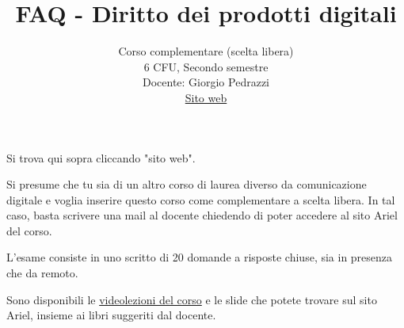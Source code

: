 \documentclass{article}
\title{FAQ - \textbf{Diritto dei prodotti digitali}}
\author{
	Corso complementare (scelta libera)\\6 CFU, Secondo semestre\\
	Docente: Giorgio Pedrazzi\\ 
	\href{https://gpedrazzidpd.ariel.ctu.unimi.it/v5/home/default.aspx/}{Sito web}
	\date{}
}
\begin{document}
 

\maketitle
	
\begin{QuestionList}
		
     {
        Si trova qui sopra cliccando "sito web".
	}
		
	 {
		Si presume che tu sia di un altro corso di laurea diverso da comunicazione digitale e voglia inserire
		questo corso come complementare a scelta libera. In tal caso, basta scrivere una mail al docente chiedendo di poter accedere al sito Ariel del corso.
	}
		
		 {
		    L'esame consiste in uno scritto di 20 domande a risposte chiuse, sia in presenza che da remoto.
		}
		
		 {
		    Sono disponibili le \href{https://www.youtube.com/channel/UCJRWh9Jp5G-_f8jvNtvtnwQ}{videolezioni del corso} e le slide che potete trovare sul sito Ariel, insieme ai libri suggeriti dal docente.
		}
		
	\end{QuestionList}
	
\end{document}
